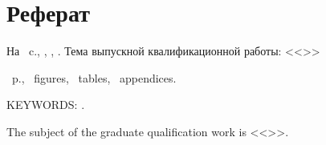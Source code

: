 \chapter*[Count-me]{Реферат} %
\thispagestyle{empty}%
%
%



На ~c.,  
,
,
.  
Тема выпускной квалификационной работы: <<\thesisTitle>>%


\abstractRu%

\printTheAbstract %


~p.,
~figures, 
~tables,
~appendices.

{\MakeUppercase{Keywords: \keywordsEn}.} %

The subject of the graduate qualification work is <<\thesisTitleEn>>.
	

\abstractEn %


\thispagestyle{empty}
%
